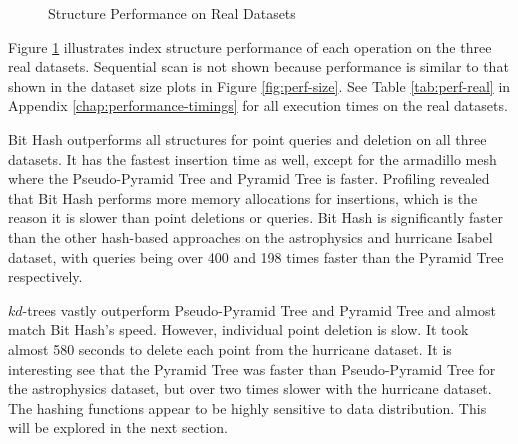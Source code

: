 \begin{figure}
	\caption{Structure Performance on Real Datasets}
	\label{fig:perf-real}
\end{figure}

Figure \ref{fig:perf-real} illustrates index structure performance of each operation on the three real datasets. Sequential scan is not shown because performance is similar to that shown in the dataset size plots in Figure \ref{fig:perf-size}. See Table \ref{tab:perf-real} in Appendix \ref{chap:performance-timings} for all execution times on the real datasets.

Bit Hash outperforms all structures for point queries and deletion on all three datasets. It has the fastest insertion time as well, except for the armadillo mesh where the Pseudo-Pyramid Tree and Pyramid Tree is faster. Profiling revealed that Bit Hash performs more memory allocations for insertions, which is the reason it is slower than point deletions or queries. Bit Hash is significantly faster than the other hash-based approaches on the astrophysics and hurricane Isabel dataset, with queries being over 400 and 198 times faster than the Pyramid Tree respectively.

$kd$-trees vastly outperform Pseudo-Pyramid Tree and Pyramid Tree and almost match Bit Hash's speed. However, individual point deletion is slow. It took almost 580 seconds to delete each point from the hurricane dataset. It is interesting see that the Pyramid Tree was faster than Pseudo-Pyramid Tree for the astrophysics dataset, but over two times slower with the hurricane dataset. The hashing functions appear to be highly sensitive to data distribution. This will be explored in the next section.

